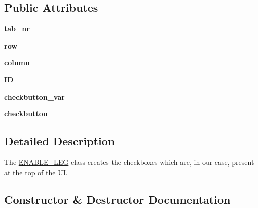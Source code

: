 \subsection*{Public Attributes}
\begin{DoxyCompactItemize}
\item 
\mbox{\label{classenable__leg_1_1ENABLE__LEG_a8b7894061264c788ee82d2401056cf98}} 
{\bfseries tab\+\_\+nr}
\item 
\mbox{\label{classenable__leg_1_1ENABLE__LEG_a3b5bd4e96c3a7d95f65ca788ed8ffc1a}} 
{\bfseries row}
\item 
\mbox{\label{classenable__leg_1_1ENABLE__LEG_a8efd7c397d80536e3aa6df0985468141}} 
{\bfseries column}
\item 
\mbox{\label{classenable__leg_1_1ENABLE__LEG_aa82acfc5b3da1c265b9f8e900d502720}} 
{\bfseries ID}
\item 
\mbox{\label{classenable__leg_1_1ENABLE__LEG_adedf90634e67f7a2de3cd8cd513d1353}} 
{\bfseries checkbutton\+\_\+var}
\item 
\mbox{\label{classenable__leg_1_1ENABLE__LEG_aeb71108846520f1649d208098686a733}} 
{\bfseries checkbutton}
\end{DoxyCompactItemize}


\subsection{Detailed Description}
The \hyperlink{classenable__leg_1_1ENABLE__LEG}{E\+N\+A\+B\+L\+E\+\_\+\+L\+EG} class creates the checkboxes which are, in our case, present at the top of the UI. 



\subsection{Constructor \& Destructor Documentation}
\mbox{\label{classenable__leg_1_1ENABLE__LEG_afb85fe64a83ca61fa442d339076361db}} 
